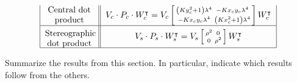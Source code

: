 \documentclass{ximera}
\begin{document}
\[{\begin{tabular}{|c||c|c|c|}
     \begin{minipage}{2cm}\begin{center}Central dot product\end{center}\end{minipage} & \multicolumn{3}{c|}{$V_c\cdot P_c\cdot W_c^\transpose = V_c\left[\begin{smallmatrix}\left(Ky_c^2+1\right)\lambda^4 & -Kx_{c}y_{c}\lambda^4\\
           -Kx_{c}y_{c}\lambda^4 & \left(Kx_c^2+1\right)\lambda^4\end{smallmatrix}\right] W_c^\transpose$}\\\hline
     \begin{minipage}{2cm}\begin{center}Stereographic dot product\end{center}\end{minipage} & \multicolumn{3}{c|}{$V_s\cdot P_s\cdot W_s^\transpose = V_s\left[\begin{smallmatrix}\rho^2 & 0\\
    0 & \rho^2 \end{smallmatrix}\right] W_s^\transpose$}\\\hline
\end{tabular}}
\]





\begin{problem}
Summarize the results from this section. In particular, indicate which
results follow from the others.
\begin{freeResponse}
\end{freeResponse}
\end{problem}
\end{document}
